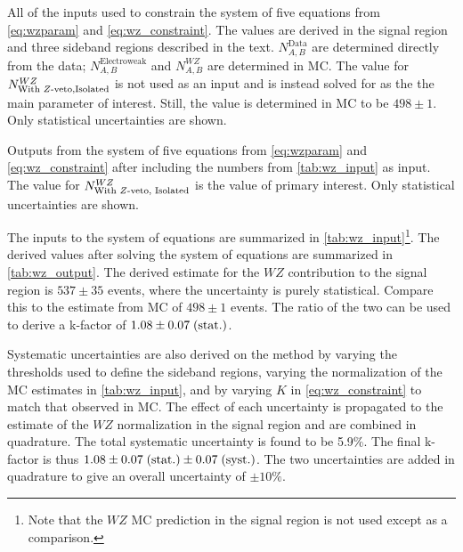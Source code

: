 \begin{table}
\centering

\caption{All of the inputs used to constrain the system of five equations
from \eqn\eqref{eq:wzparam} and \eqn\eqref{eq:wz_constraint}.
The values are derived in the signal region and three sideband regions
described in the text. $N^{\textrm{Data}}_{A,B}$ are determined directly
from the data; $N^{\textrm{Electroweak}}_{A,B}$ and $N^{WZ}_{A,B}$ are 
determined in MC. The value for $N^{WZ}_{\textrm{With \z-veto,Isolated}}$ is
not used as an input and is instead solved for as the the main
parameter of interest. Still, the value is determined in MC to be
$498 \pm 1$.  Only statistical uncertainties are shown.}
\label{tab:wz_input}
\end{table}

\begin{table}
\centering

\caption{Outputs from the system of five equations
from \eqn\eqref{eq:wzparam} and \eqn\eqref{eq:wz_constraint}
after including the numbers from \tab\ref{tab:wz_input} as input.
The value for $N^{WZ}_{\textrm{With \z-veto, Isolated}}$ is 
the value of primary interest.  Only statistical uncertainties are shown.}
\label{tab:wz_output}
\end{table}


The inputs to the system of equations are summarized in 
\tab\ref{tab:wz_input}\footnote{Note that the $WZ$ MC prediction in 
the signal region is not used except as a comparison.}.
The derived values after solving the system of equations are
summarized in \tab\ref{tab:wz_output}. 
The derived estimate for the $WZ$ contribution to 
the signal region is 
$537 \pm 35$
events, where the uncertainty is purely statistical. 
Compare this to the estimate from MC of 
$498 \pm 1$ events.
The ratio of the two can be used to derive a k-factor of
$1.08\pm0.07\mbox{$\;$(stat.)}$. 


Systematic uncertainties are also derived on the method
by varying the 
thresholds used to define the sideband regions, varying the normalization
of the MC estimates in \tab\ref{tab:wz_input}, and by varying $K$ 
in \eqn\eqref{eq:wz_constraint} to match that observed in MC. The effect of each
uncertainty is propagated to the estimate of the $WZ$ normalization in
the signal region and are combined in quadrature. The total systematic
uncertainty is found to be 5.9\%. 
The final k-factor is thus $1.08 \pm0.07\mbox{$\;$(stat.)}\pm0.07\mbox{$\;$(syst.)}$.
The two uncertainties are added in quadrature to give an overall uncertainty
of $\pm 10\%$.

